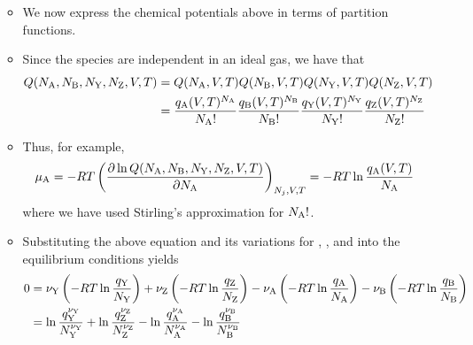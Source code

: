 \documentclass[../notes.tex]{subfiles}
\begin{document}
\begin{itemize}
\begin{itemize}
\begin{equation*}
        \end{equation*}
        \item We now express the chemical potentials above in terms of partition functions.
        \item Since the species are independent in an ideal gas, we have that
        \begin{align*}
            Q(N_{\ce{A}},N_{\ce{B}},N_{\ce{Y}},N_{\ce{Z}},V,T) &= Q(N_{\ce{A}},V,T)Q(N_{\ce{B}},V,T)Q(N_{\ce{Y}},V,T)Q(N_{\ce{Z}},V,T)\\
            &= \frac{q_{\ce{A}}(V,T)^{N_{\ce{A}}}}{N_{\ce{A}}!}\frac{q_{\ce{B}}(V,T)^{N_{\ce{B}}}}{N_{\ce{B}}!}\frac{q_{\ce{Y}}(V,T)^{N_{\ce{Y}}}}{N_{\ce{Y}}!}\frac{q_{\ce{Z}}(V,T)^{N_{\ce{Z}}}}{N_{\ce{Z}}!}
        \end{align*}
        \item Thus, for example,
        \begin{equation*}
            \mu_{\ce{A}} = -RT\left( \pdv{\ln Q(N_{\ce{A}},N_{\ce{B}},N_{\ce{Y}},N_{\ce{Z}},V,T)}{N_{\ce{A}}} \right)_{N_j,V,T}
            = -RT\ln\frac{q_{\ce{A}}(V,T)}{N_{\ce{A}}}
        \end{equation*}
        where we have used Stirling's approximation for $N_{\ce{A}}!$.
        \item Substituting the above equation and its variations for , , and  into the equilibrium conditions yields
        \begin{align*}
            0 &= \nu_{\ce{Y}}\left( -RT\ln\frac{q_{\ce{Y}}}{N_{\ce{Y}}} \right)+\nu_{\ce{Z}}\left( -RT\ln\frac{q_{\ce{Z}}}{N_{\ce{Z}}} \right)-\nu_{\ce{A}}\left( -RT\ln\frac{q_{\ce{A}}}{N_{\ce{A}}} \right)-\nu_{\ce{B}}\left( -RT\ln\frac{q_{\ce{B}}}{N_{\ce{B}}} \right)\\
            &= \ln\frac{q_{\ce{Y}}^{\nu_{\ce{Y}}}}{N_{\ce{Y}}^{\nu_{\ce{Y}}}}+\ln\frac{q_{\ce{Z}}^{\nu_{\ce{Z}}}}{N_{\ce{Z}}^{\nu_{\ce{Z}}}}-\ln\frac{q_{\ce{A}}^{\nu_{\ce{A}}}}{N_{\ce{A}}^{\nu_{\ce{A}}}}-\ln\frac{q_{\ce{B}}^{\nu_{\ce{B}}}}{N_{\ce{B}}^{\nu_{\ce{B}}}}\\

\end{align*}
\end{itemize}
\end{itemize}
\end{document}
